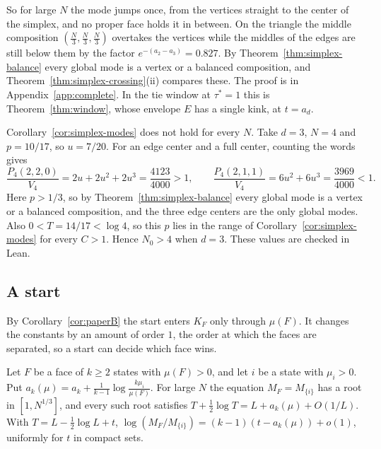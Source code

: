 So for large $N$ the mode jumps once, from the vertices straight to the center of the simplex,
and no proper face holds it in between. On the triangle the middle composition
$(\frac N3,\frac N3,\frac N3)$ overtakes the vertices while the middles of the edges are still
below them by the factor $e^{-(a_2-a_3)}=0.827$. By Theorem~\ref{thm:simplex-balance} every
global mode is a vertex or a balanced composition, and Theorem~\ref{thm:simplex-crossing}(ii) compares
these. The proof is in Appendix~\ref{app:complete}. In the tie window at $\tau^*=1$ this is
Theorem~\ref{thm:window}, whose envelope $E$ has a single kink, at $t=a_d$.

\begin{remark}\label{ex:simplex-edge-mode}
Corollary~\ref{cor:simplex-modes} does not hold for every $N$. Take $d=3$, $N=4$
and $p=10/17$, so $u=7/20$. For an edge center and a full center, counting the words gives
\[
\frac{P_4(2,2,0)}{V_4}=2u+2u^2+2u^3=\frac{4123}{4000}>1,
\qquad
\frac{P_4(2,1,1)}{V_4}=6u^2+6u^3=\frac{3969}{4000}<1.
\]
Here $p>1/3$, so by Theorem~\ref{thm:simplex-balance} every global mode is a vertex or a
balanced composition, and the three edge centers are the only global modes. Also
$0<T=14/17<\log4$, so this $p$ lies in the range of Corollary~\ref{cor:simplex-modes} for
every $C>1$. Hence $N_0>4$ when $d=3$. These values are checked in Lean.
\end{remark}

\subsection{A start}\label{sec:start}

By Corollary~\ref{cor:paperB} the start enters $K_F$ only through $\mu(F)$. It changes the
constants by an amount of order $1$, the order at which the faces are separated, so a start can
decide which face wins.

\begin{corollary}\label{cor:start-crossings}
Let $F$ be a face of $k\ge2$ states with $\mu(F)>0$, and let $i$ be a state with $\mu_i>0$. Put
$a_k(\mu)=a_k+\frac1{k-1}\log\frac{k\mu_i}{\mu(F)}$. For large $N$ the equation
$M_F=M_{\{i\}}$ has a root in $[1,N^{1/3}]$, and every such root satisfies
$T+\frac12\log T=L+a_k(\mu)+O(1/L)$. With $T=L-\frac12\log L+t$,
$\log(M_F/M_{\{i\}})=(k-1)(t-a_k(\mu))+o(1)$, uniformly for $t$ in compact sets.
\end{corollary}

